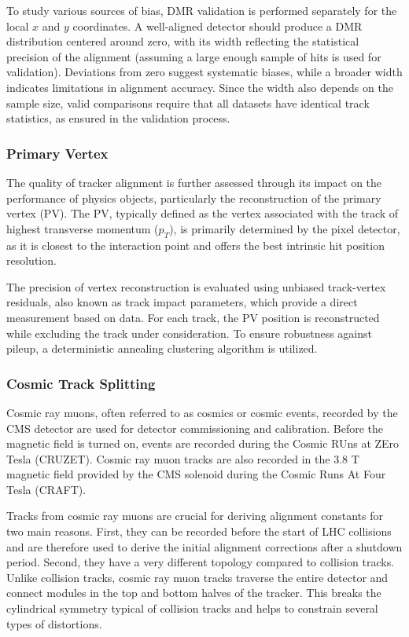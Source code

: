 To study various sources of bias, DMR validation is performed separately for the local \( x \) and \( y \) coordinates. A well-aligned detector should produce a DMR distribution centered around zero, with its width reflecting the statistical precision of the alignment (assuming a large enough sample of hits is used for validation). Deviations from zero suggest systematic biases, while a broader width indicates limitations in alignment accuracy. Since the width also depends on the sample size, valid comparisons require that all datasets have identical track statistics, as ensured in the validation process.

\subsubsection{Primary Vertex}

The quality of tracker alignment is further assessed through its impact on the performance of physics objects, particularly the reconstruction of the primary vertex (PV). The PV, typically defined as the vertex associated with the track of highest transverse momentum (\( p_T \)), is primarily determined by the pixel detector, as it is closest to the interaction point and offers the best intrinsic hit position resolution. 

The precision of vertex reconstruction is evaluated using unbiased track-vertex residuals, also known as track impact parameters, which provide a direct measurement based on data. For each track, the PV position is reconstructed while excluding the track under consideration. To ensure robustness against pileup, a deterministic annealing clustering algorithm is utilized. 

\subsubsection{Cosmic Track Splitting}

Cosmic ray muons, often referred to as cosmics or cosmic events, recorded by the CMS detector are used for detector commissioning and calibration. Before the magnetic field is turned on, events are recorded during the Cosmic RUns at ZEro Tesla (CRUZET). Cosmic ray muon tracks are also recorded in the 3.8 T magnetic field provided by the CMS solenoid during the Cosmic Runs At Four Tesla (CRAFT).

Tracks from cosmic ray muons are crucial for deriving alignment constants for two main reasons. First, they can be recorded before the start of LHC collisions and are therefore used to derive the initial alignment corrections after a shutdown period. Second, they have a very different topology compared to collision tracks. Unlike collision tracks, cosmic ray muon tracks traverse the entire detector and connect modules in the top and bottom halves of the tracker. This breaks the cylindrical symmetry typical of collision tracks and helps to constrain several types of distortions.

